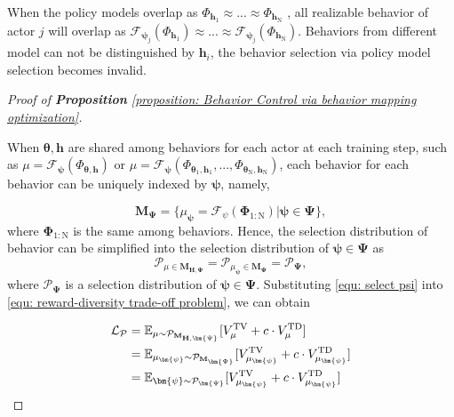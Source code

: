 \begin{Corollary}
\label{Corollary:Behavior Circling in policy model Selection}
    When the policy models overlap as $\Phi_{\mathbf{h}_1} \approx ... \approx \Phi_{\mathbf{h}_\mathrm{N}}$ , all realizable behavior of actor $j$ will overlap as $\mathcal{F}_{\bm{\psi}_j}(\Phi_{\mathbf{h}_1}) \approx ... \approx \mathcal{F}_{\bm{\psi}_j}(\Phi_{\mathbf{h}_\mathrm{N}})$. Behaviors from different model can not be distinguished by $\mathbf{h}_i$, the behavior selection via policy model selection becomes invalid. 
\end{Corollary}




\begin{proof}[Proof of \textbf{Proposition} \ref{proposition: Behavior Control via behavior mapping optimization}]
   \label{pf: pr 2} 

   When $\bm{\theta},\mathbf{h}$ are shared among behaviors for each actor at each training step, such as $\mu=\mathcal{F}_{\bm{\psi}}(\Phi_{\bm{\theta},\mathbf{h}})$ or $\mu=\mathcal{F}_{\bm{\psi}}(\Phi_{\bm{\theta}_1, \mathbf{h}_1},...,\Phi_{\bm{\theta}_\mathrm{N}, \mathbf{h}_\mathrm{N}})$, each behavior for each behavior can be uniquely indexed by $\bm{\psi}$, namely, 
   
\begin{equation*}
    \mathbf{M}_{\bm{\Psi}} = \{ \mu_{\bm{\psi}} = \mathcal{F}_{\psi}(\bm{\Phi}_{1:\mathrm{N}}) | \bm{\psi} \in \bm{\Psi}\}, 
\end{equation*}
where $\bm{\Phi}_{1:\mathrm{N}}$ is the same among behaviors. Hence, the selection distribution of behavior can be simplified into the selection distribution of $\bm{\psi} \in \bm{\Psi}$ as 
\begin{equation}
\label{equ: select psi}
    \mathcal{P}_{\mu \in \mathbf{M}_{\mathbf{H},\bm{\Psi}}} = \mathcal{P}_{\mu_{\bm{\psi}} \in \mathbf{M}_{\bm{\Psi}}} = \mathcal{P}_\mathbf{\Psi},
\end{equation}
where  $\mathcal{P}_{\bm{\Psi}}$ is a selection distribution of $\bm{\psi} \in \bm{\Psi}$. Substituting \eqref{equ: select psi} into \eqref{equ: reward-diversity trade-off problem}, we can obtain

\begin{equation*}
\setlength{\abovedisplayskip}{0.5pt}
\setlength{\belowdisplayskip}{0.5pt}
\begin{aligned}
        \mathcal{L}_{\mathcal{P}}
    & = 
    \mathbb{E}_{\mu \sim \mathcal{P}_{\mathbf{M}_{\mathbf{H},\bm{\Psi}}}}  [V^{\mathrm{TV}}_{\mu}+c \cdot V^{\mathrm{TD}}_{\mu}] \\
    &= \mathbb{E}_{\mu_{\bm{\psi}} \sim \mathcal{P}_{\mathbf{M}_{\bm{\Psi}}}}  [V^{\mathrm{TV}}_{\mu_{\bm{\psi}}}+c \cdot V^{\mathrm{TD}}_{\mu_{\bm{\psi}}}] \\
    &= \mathbb{E}_{\bm{\psi} \sim \mathcal{P}_{\bm{\Psi}}}  [V^{\mathrm{TV}}_{\mu_{\bm{\psi}}}+c \cdot V^{\mathrm{TD}}_{\mu_{\bm{\psi}}}] \\
\end{aligned}
\end{equation*}


\end{proof}



